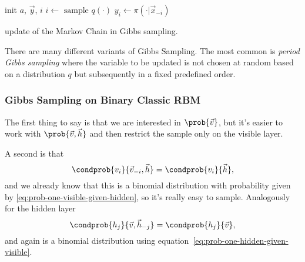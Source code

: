   \begin{algorithm}[H]
    \DontPrintSemicolon
    
    
    init \(a\), \(\vec{y}\), \(i\)\;
    \(i \leftarrow \text{ sample } q{(\cdot)}\)\;
    \( y_i \leftarrow \pi{(\cdot|\vec{x}_{-i})}\)\;
    
    \caption{update of the Markov Chain in Gibbs sampling.}
    \label{alg:gibbs-sampling-general}
  \end{algorithm}
  There are many different variants of Gibbs Sampling. The most common is \emph{period Gibbs sampling}
  where the variable to be updated is not chosen at random based on a distribution \(q\) but
  subsequently in a fixed predefined order. 
  
  
  \subsubsection{Gibbs Sampling on Binary Classic RBM}
  The first thing to say is that we are interested in \(\prob{\vec{v}}\), but it's easier to work
  with \(\prob{\vec{v},\vec{h}}\) and then restrict the sample only on the visible layer.
  
  A second is that
  \[
    \condprob{v_i}{\vec{v}_{-i},\vec{h}} = \condprob{v_i}{\vec{h}},
  \]
  and we already know that this is a binomial distribution with probability given by \eqref{eq:prob-one-visible-given-hidden}, so it's really easy to sample.
  Analogously for the hidden layer
  \[
    \condprob{h_j}{\vec{v},\vec{h}_{-j}} = \condprob{h_j}{\vec{v}},
  \]
  and again is a binomial distribution using equation~\eqref{eq:prob-one-hidden-given-visible}.
  
